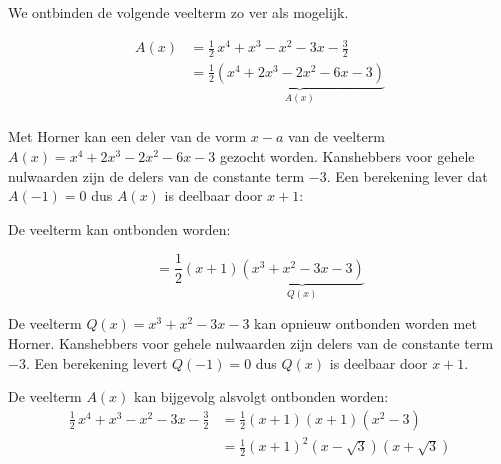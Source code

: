 \documentclass{ximera}
\begin{document}
\begin{example} 
We ontbinden de volgende veelterm zo ver als mogelijk.
\renewcommand{\kolbreed}{\widthof{\(-6\)}}



$$
\begin{array}{rl}
	 A(x) &= \frac{1}{2}\,x^4 + x^3 - x^2 - 3x - \frac{3}{2} \\
	      &= \frac{1}{2}\underbrace{\left(x^4 + 2x^3 - 2x^2 - 6x - 3 \right)}_{A(x)} \\
\end{array}
$$

Met Horner kan een deler van de vorm \(x-a\) van de veelterm \(A(x) = x^4 + 2x^3 - 2x^2 - 6x - 3 \) gezocht worden. Kanshebbers voor gehele nulwaarden zijn de delers van de constante term \(-3\). Een berekening lever dat \(  A(-1) = 0\) dus \(A(x)\) is deelbaar door  \(x+1\): 


De veelterm kan ontbonden worden: 

\[
= \frac{1}{2}(x+1)\underbrace{(x^3+x^2-3x-3)}_{Q(x)} 
\]

De veelterm \( Q(x) = x^3+x^2-3x-3 \) kan opnieuw ontbonden worden met Horner. Kanshebbers voor gehele nulwaarden zijn delers van de constante term \(-3\). 
Een berekening levert \(Q(-1) = 0\) dus \(Q(x)\) is deelbaar door \(x+1\).


De veelterm \(A(x)\) kan bijgevolg alsvolgt ontbonden worden: 
$$
\begin{array}{rl}
	\frac{1}{2}\,x^4 + x^3 - x^2 - 3x - \frac{3}{2} & = \frac{1}{2}(x+1)(x+1)(x^2-3) \\
													& = \frac{1}{2}(x+1)^2(x-\sqrt{3})(x+\sqrt{3})
\end{array}
$$
\end{example} 
\end{document}

